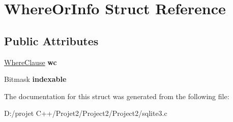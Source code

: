 \hypertarget{struct_where_or_info}{}\section{Where\+Or\+Info Struct Reference}
\label{struct_where_or_info}
\subsection*{Public Attributes}
\begin{DoxyCompactItemize}
\item 
\mbox{\label{struct_where_or_info_a45bb04e5ea24ec549f060bc8b210ec71}} 
\mbox{\hyperlink{struct_where_clause}{Where\+Clause}} {\bfseries wc}
\item 
\mbox{\label{struct_where_or_info_a39777f291e1e516f01b05b71a9805357}} 
Bitmask {\bfseries indexable}
\end{DoxyCompactItemize}


The documentation for this struct was generated from the following file\+:\begin{DoxyCompactItemize}
\item 
D\+:/projet C++/\+Projet2/\+Project2/\+Project2/sqlite3.\+c\end{DoxyCompactItemize}
